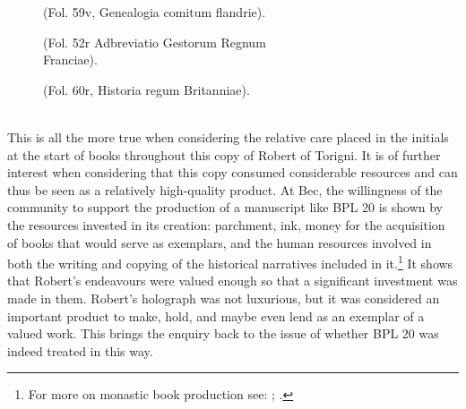 \begin{paper}
\begin{figure}[H]
  \centering
    \caption{(Fol. 59v, Genealogia comitum flandrie).}
    \label{fig:escobar21}
  \end{figure}

\begin{figure}[H]
  \centering
  \begin{minipage}[b]{0.39\textwidth}
    \caption{(Fol. 52r Adbreviatio Gestorum Regnum \\Franciae).}
    \label{fig:escobar22}
  \end{minipage}
  \hfill
  \begin{minipage}[b]{0.55\textwidth}
    \caption{(Fol. 60r, Historia regum Britanniae).\\ \\}
    \label{fig:escobar23}
  \end{minipage}
\end{figure}

This is all the more true when considering the relative care placed in
the initials at the start of books throughout this copy of Robert of
Torigni. It is of further interest when considering that this copy
consumed considerable resources and can thus be seen as a relatively
high-quality product. At Bec, the willingness of the community to
support the production of a manuscript like BPL 20 is shown by the
resources invested in its creation: parchment, ink, money for the
acquisition of books that would serve as exemplars, and the human
resources involved in both the writing and copying of the historical
narratives included in it.\footnote{For more on monastic book production
  see: \cite{thomson_monastic_2008}; \cite{webber_monastic_2008}.} It shows that Robert's
endeavours were valued enough so that a significant investment was made
in them. Robert's holograph was not luxurious, but it was considered an
important product to make, hold, and maybe even lend as an exemplar of a
valued work. This brings the enquiry back to the issue of whether BPL 20
was indeed treated in this way.


\end{paper}

